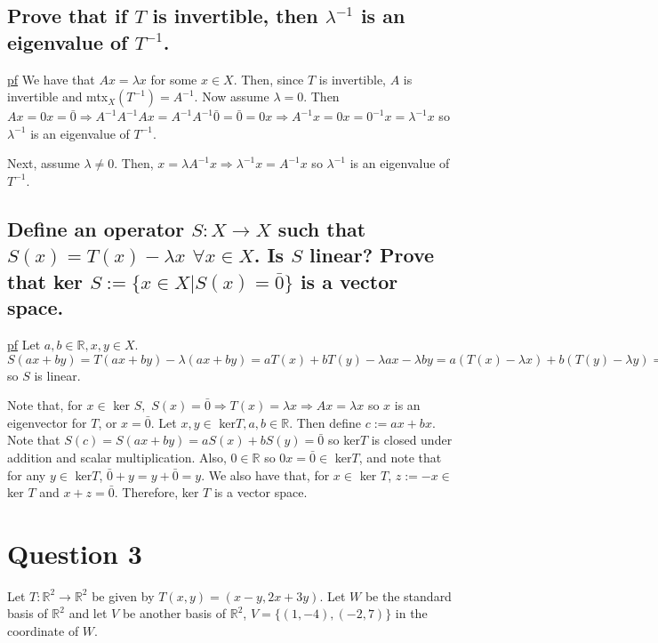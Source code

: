\documentclass[11pt]{article} %
\begin{document}
\subsection{Prove that if $T$ is invertible, then $\lambda^{-1}$ is an eigenvalue of $T^{-1}$.}
\underline{pf} We have that $Ax = \lambda x$ for some $x \in X$. Then, since $T$ is invertible, $A$ is invertible and mtx$_X(T^{-1}) = A^{-1}.$ Now assume $\lambda = 0$. Then $Ax = 0x = \bar{0} \Rightarrow A^{-1} A^{-1} A x = A^{-1} A^{-1} \bar{0} = \bar{0} = 0x \Rightarrow A^{-1}x = 0 x = 0^{-1} x = \lambda^{-1} x$ so $\lambda^{-1}$ is an eigenvalue of $T^{-1}.$ 

Next, assume $\lambda \neq 0.$ Then, $x = \lambda A^{-1}x \Rightarrow \lambda^{-1} x = A^{-1}x$ so $\lambda^{-1}$ is an eigenvalue of $T^{-1}$.

\subsection{Define an operator $S: X \rightarrow X$ such that $S(x) = T(x) - \lambda x$ $\forall x \in X$. Is $S$ linear? Prove that ker $S:= \{ x \in X | S(x) = \bar{0}\}$ is a vector space.}
\underline{pf} Let $a,b \in \mathbb{R}, x,y \in X.$ $S(ax + by) = T(ax + by) - \lambda(ax+by) = aT(x) + bT(y) - \lambda a x - \lambda b y = a(T(x) - \lambda x) + b(T(y) - \lambda y) = aS(x) + bS(y)$ so $S$ is linear.

Note that, for $x \in $ ker $S,$ $S(x) = \bar{0} \Rightarrow T(x) = \lambda x \Rightarrow Ax = \lambda x$ so $x$ is an eigenvector for $T$, or $x = \bar{0}$. Let $x,y \in $ ker$T, a,b \in \mathbb{R}.$ Then define $c:= ax +bx.$ Note that $S(c) = S(ax+by) = aS(x)+bS(y) = \bar{0}$ so ker$T$ is closed under addition and scalar multiplication. Also, $0 \in \mathbb{R}$ so $0x = \bar{0} \in$ ker$T$, and note that for any $y \in $ ker$T$, $\bar{0} + y = y+\bar{0} = y.$  We also have that, for $x \in $ ker $T$, $z := -x \in $ ker $T$ and $x+z = \bar{0}.$ Therefore, ker $T$ is a vector space.


\section{Question 3}
Let $T: \mathbb{R}^2 \rightarrow \mathbb{R}^2$ be given by $T(x,y) = (x-y,2x+3y).$ Let $W$ be the standard basis of $\mathbb{R}^2$ and let $V$ be another basis of $\mathbb{R}^2$, $V = \{(1,-4),(-2,7) \}$ in the coordinate of $W$.
\end{document}
